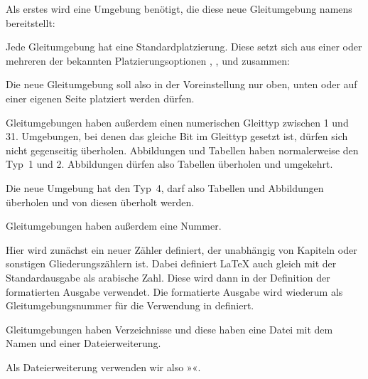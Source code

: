 Als erstes wird eine Umgebung benötigt, die diese neue
Gleitumgebung \iftrue%
namens  bereitstellt:%
\else%
bereitstellt. Das geht ganz einfach mit:%
\fi%
\begin{lstcode}
  \newenvironment{remarkbox}%
    {\@float{remarkbox}}%
    {\end@float}
\end{lstcode}
\iffalse Die neue Umgebung heißt also \Environment{remarkbox}.\fi %

Jede Gleitumgebung hat eine Standardplatzierung. Diese
setzt sich aus einer oder mehreren der bekannten Platzierungsoptionen
, ,  und  zusammen:
\begin{lstcode}
  \newcommand*{\fps@remarkbox}{tbp}
\end{lstcode}
Die neue Gleitumgebung soll also in der Voreinstellung nur oben, unten oder
auf einer eigenen Seite platziert werden dürfen.

Gleitumgebungen haben außerdem einen numerischen Gleittyp
zwischen 1 und 31. Umgebungen, bei denen das gleiche Bit
im Gleittyp gesetzt ist, dürfen sich nicht gegenseitig überholen. Abbildungen
und Tabellen haben normalerweise den Typ~1 und 2. Abbildungen dürfen also
Tabellen überholen und umgekehrt.
\begin{lstcode}
  \newcommand*{\ftype@remarkbox}{4}
\end{lstcode}
Die neue Umgebung hat den Typ~4, darf also Tabellen und Abbildungen überholen
und von diesen überholt werden.

Gleitumgebungen haben außerdem eine Nummer.
\begin{lstcode}
  \newcommand*{\remarkboxformat}{%
    Merksatz~\theremarkbox\csname autodot\endcsname
  }
  \newcommand*{\fnum@remarkbox}{\remarkboxformat}
\end{lstcode}
Hier wird zunächst ein neuer Zähler definiert, der unabhängig von Kapiteln
oder sonstigen Gliederungszählern ist. Dabei definiert \LaTeX{} auch gleich
 mit der Standardausgabe als arabische Zahl. Diese wird
dann in der Definition der formatierten Ausgabe verwendet. Die formatierte
Ausgabe wird wiederum als Gleitumgebungsnummer für die Verwendung in
 definiert.

Gleitumgebungen haben Verzeichnisse und diese haben
eine Datei mit dem Namen  und einer Dateierweiterung.
\begin{lstcode}
  \newcommand*{\ext@remarkbox}{lor}
\end{lstcode}
Als Dateierweiterung verwenden wir also »«.

